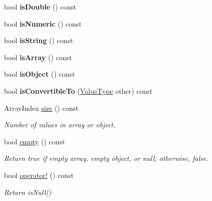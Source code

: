 \begin{DoxyCompactItemize}
bool {\bfseries is\+Double} () const
\item 
\mbox{\label{class_json_1_1_value_af961a000cd203c895e44c195ab39b866}} 
bool {\bfseries is\+Numeric} () const
\item 
\mbox{\label{class_json_1_1_value_a71e1f82cf1c3eaf969d400dcffb163a6}} 
bool {\bfseries is\+String} () const
\item 
\mbox{\label{class_json_1_1_value_a1627eb9d6568d6d0252fa8bb711c0a59}} 
bool {\bfseries is\+Array} () const
\item 
\mbox{\label{class_json_1_1_value_a8cf96c0f2a552051fcfc78ffee60e037}} 
bool {\bfseries is\+Object} () const
\item 
\mbox{\label{class_json_1_1_value_af1ee6be27a96a7d12128efdd60deb54d}} 
bool {\bfseries is\+Convertible\+To} (\hyperlink{namespace_json_a7d654b75c16a57007925868e38212b4e}{Value\+Type} other) const
\item 
\mbox{\label{class_json_1_1_value_a0ec2808e1d7efa4e9fad938d6667be44}} 
Array\+Index \hyperlink{class_json_1_1_value_a0ec2808e1d7efa4e9fad938d6667be44}{size} () const
\begin{DoxyCompactList}\small\item\em Number of values in array or object. \end{DoxyCompactList}\item 
\mbox{\label{class_json_1_1_value_a0519a551e37ee6665d74742b3f96bab3}} 
bool \hyperlink{class_json_1_1_value_a0519a551e37ee6665d74742b3f96bab3}{empty} () const
\begin{DoxyCompactList}\small\item\em Return true if empty array, empty object, or null; otherwise, false. \end{DoxyCompactList}\item 
\mbox{\label{class_json_1_1_value_a731b89fb4764c39ce2328e1707c822b9}} 
bool \hyperlink{class_json_1_1_value_a731b89fb4764c39ce2328e1707c822b9}{operator!} () const
\begin{DoxyCompactList}\small\item\em Return is\+Null() \end{DoxyCompactList}\item 

\end{DoxyCompactItemize}
